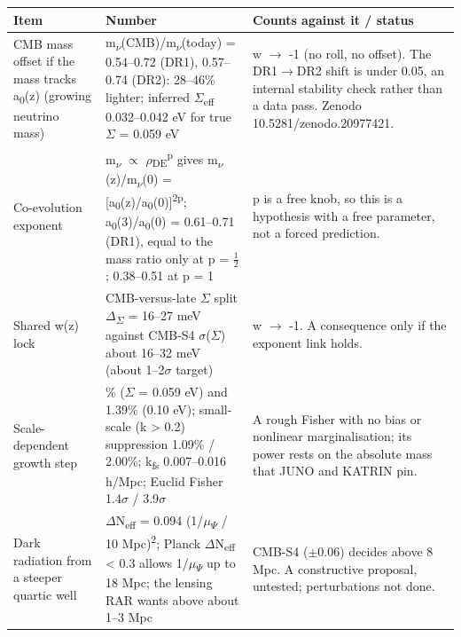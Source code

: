 \documentclass[10pt]{article}
\begin{document}
{\footnotesize\begin{longtable}{>{\raggedright\arraybackslash}p{\dimexpr(\linewidth-6\tabcolsep)/3\relax}>{\raggedright\arraybackslash}p{\dimexpr(\linewidth-6\tabcolsep)/3\relax}>{\raggedright\arraybackslash}p{\dimexpr(\linewidth-6\tabcolsep)/3\relax}}
\toprule
\textbf{Item} & \textbf{Number} & \textbf{Counts against it / status} \\
\midrule
\endhead
CMB mass offset if the mass tracks a\textsubscript{0}(z) (growing neutrino mass) & m\textsubscript{\ensuremath{\nu}}(CMB)/m\textsubscript{\ensuremath{\nu}}(today) = 0.54--0.72 (DR1), 0.57--0.74 (DR2): 28--46\% lighter; inferred \ensuremath{\Sigma}\textsubscript{eff} 0.032--0.042 eV for true \ensuremath{\Sigma} = 0.059 eV & w \ensuremath{\rightarrow} -1 (no roll, no offset). The DR1\ensuremath{\rightarrow}DR2 shift is under 0.05, an internal stability check rather than a data pass. Zenodo 10.5281/zenodo.20977421. \\
Co-evolution exponent & m\textsubscript{\ensuremath{\nu}} \ensuremath{\propto} \ensuremath{\rho}\textsubscript{DE}\textsuperscript{p} gives m\textsubscript{\ensuremath{\nu}}(z)/m\textsubscript{\ensuremath{\nu}}(0) = [a\textsubscript{0}(z)/a\textsubscript{0}(0)]\textsuperscript{2p}; a\textsubscript{0}(3)/a\textsubscript{0}(0) = 0.61--0.71 (DR1), equal to the mass ratio only at p = \ensuremath{\tfrac{1}{2}}; 0.38--0.51 at p = 1 & p is a free knob, so this is a hypothesis with a free parameter, not a forced prediction. \\
Shared w(z) lock & CMB-versus-late \ensuremath{\Sigma} split \ensuremath{\Delta}\textsubscript{\ensuremath{\Sigma}} = 16--27 meV against CMB-S4 \ensuremath{\sigma}(\ensuremath{\Sigma}) about 16--32 meV (about 1--2\ensuremath{\sigma} target) & w \ensuremath{\rightarrow} -1. A consequence only if the exponent link holds. \\
Scale-dependent growth step & 0.65\% (\ensuremath{\Sigma} = 0.059 eV) and 1.39\% (0.10 eV); small-scale (k > 0.2) suppression 1.09\% / 2.00\%; k\textsubscript{fs} 0.007--0.016 h/Mpc; Euclid Fisher 1.4\ensuremath{\sigma} / 3.9\ensuremath{\sigma} & A rough Fisher with no bias or nonlinear marginalisation; its power rests on the absolute mass that JUNO and KATRIN pin. \\
Dark radiation from a steeper quartic well & \ensuremath{\Delta}N\textsubscript{eff} = 0.094 (1/\ensuremath{\mu}\textsubscript{\ensuremath{\Psi}} / 10 Mpc)\textsuperscript{2}; Planck \ensuremath{\Delta}N\textsubscript{eff} < 0.3 allows 1/\ensuremath{\mu}\textsubscript{\ensuremath{\Psi}} up to 18 Mpc; the lensing RAR wants above about 1--3 Mpc & CMB-S4 (\ensuremath{\pm}0.06) decides above 8 Mpc. A constructive proposal, untested; perturbations not done. \\

\end{longtable}}
\end{document}
